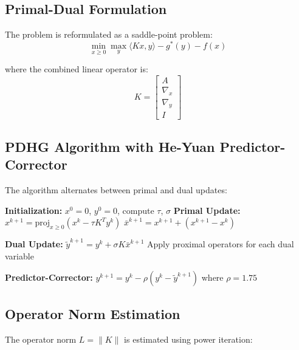 \documentclass[11pt]{article}
\begin{document}
\subsection{Primal-Dual Formulation}

The problem is reformulated as a saddle-point problem:
\begin{equation}
\min_{x \geq 0} \max_{y} \langle Kx, y \rangle - g^*(y) - f(x)
\end{equation}

where the combined linear operator is:
\begin{equation}
K = \begin{bmatrix}
A \\
\nabla_x \\
\nabla_y \\
I
\end{bmatrix}
\end{equation}

\subsection{PDHG Algorithm with He-Yuan Predictor-Corrector}

The algorithm alternates between primal and dual updates:

\begin{algorithm}
\caption{PDHG with He-Yuan Predictor-Corrector}
\begin{algorithmic}
\STATE \textbf{Initialization:} $x^0 = 0$, $y^0 = 0$, compute $\tau$, $\sigma$
    \STATE \textbf{Primal Update:}
    \STATE $x^{k+1} = \text{proj}_{x \geq 0}\left(x^k - \tau K^T y^k\right)$
    \STATE $\bar{x}^{k+1} = x^{k+1} + (x^{k+1} - x^k)$ 
    
    \STATE \textbf{Dual Update:}
    \STATE $\tilde{y}^{k+1} = y^k + \sigma K\bar{x}^{k+1}$
    \STATE Apply proximal operators for each dual variable
    
    \STATE \textbf{Predictor-Corrector:}
    \STATE $y^{k+1} = y^k - \rho(y^k - \tilde{y}^{k+1})$ where $\rho = 1.75$
\ENDFOR
\end{algorithmic}
\end{algorithm}

\subsection{Operator Norm Estimation}

The operator norm $L = \|K\|$ is estimated using power iteration:
\end{document}
